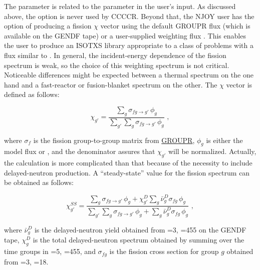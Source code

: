 The  parameter is related to the  parameter in
the user's input.  As discussed above, the option  is
never used by CCCCR.  Beyond that, the NJOY user has the option of producing
a fission $\chi$ vector using the default GROUPR flux (which is available
on the GENDF tape) or a user-supplied weighting flux .  This
enables the user to produce an ISOTXS library appropriate to a class of
problems with a flux similar to .  In general, the
incident-energy dependence of the fission spectrum is weak, so the
choice of this weighting spectrum is not critical.  Noticeable differences
might be expected between a thermal spectrum on the one hand and a
fast-reactor or fusion-blanket spectrum on the other.  The $\chi$ vector
is defined as follows:

\begin{equation}
   \chi_{g'}=\frac{\displaystyle\sum_g \sigma_{f g\rightarrow g'}\,\phi_g}
       {\displaystyle\sum_{g'} \sum_g \sigma_{f g\rightarrow g'}\,\phi_g}\,\, ,
\end{equation}

\noindent
where $\sigma_f$ is the fission group-to-group matrix from
\hyperlink{sGROUPRhy}{GROUPR},
$\phi_g$ is either the model flux or , and the denominator
assures that $\chi_{g'}$ will be normalized.  Actually, the calculation
is more complicated than that because of the necessity to include
delayed-neutron production.  A ``steady-state'' value for the fission
spectrum can be obtained as follows:

\begin{equation}
   \chi^{SS}_{g'}=\frac{\displaystyle\sum_g\sigma_{f g\rightarrow g'}
     \,\phi_g + \chi^D_{g'}\sum_g\bar{\nu}^D_g\sigma_{fg}\,\phi_g}
     {\displaystyle\sum_{g'}\sum_g\sigma_{f g\rightarrow g'}\,\phi_g
     +\sum_g\bar{\nu}^D_g\sigma_{fg}\,\phi_g} \,\,,
\end{equation}

\noindent
where $\bar{\nu}^D_g$ is the delayed-neutron yield obtained from
=3, =455 on the GENDF tape, $\chi^D_g$ is the
total delayed-neutron
spectrum obtained by summing over the time groups in
=5, =455,
and $\sigma_{fg}$ is the fission cross section for group $g$ obtained
from =3, =18.

